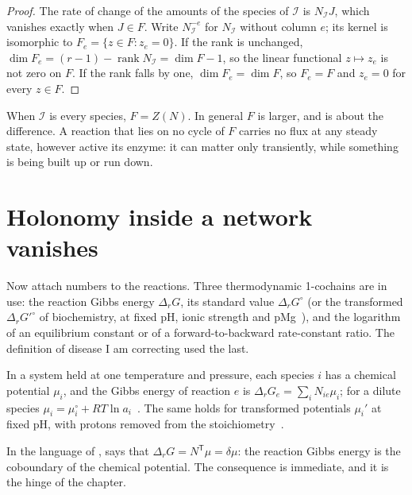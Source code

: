 \begin{proof}
The rate of change of the amounts of the species of $\mathcal I$ is
$N_{\mathcal I}J$, which vanishes exactly when $J\in F$. Write
$N_{\mathcal I}^{-e}$ for $N_{\mathcal I}$ without column $e$; its kernel is
isomorphic to $F_e=\{z\in F:z_e=0\}$. If the rank is unchanged,
$\dim F_e=(r-1)-\operatorname{rank}N_{\mathcal I}=\dim F-1$, so the linear
functional $z\mapsto z_e$ is not zero on $F$. If the rank falls by one,
$\dim F_e=\dim F$, so $F_e=F$ and $z_e=0$ for every $z\in F$.
\end{proof}

When $\mathcal I$ is every species, $F=Z(N)$. In general $F$ is larger, and
 is about the difference. A reaction that lies on no
cycle of $F$ carries no flux at any steady state, however active its enzyme:
it can matter only transiently, while something is being built up or run
down.

\section{Holonomy inside a network vanishes}
\label{c1:sec-internal}

Now attach numbers to the reactions. Three thermodynamic 1-cochains are in
use: the reaction Gibbs energy $\Delta_rG$, its standard value
$\Delta_rG^{\circ}$ (or the transformed $\Delta_rG'^{\circ}$ of biochemistry,
at fixed pH, ionic strength and pMg~\citep{alberty2003}), and the logarithm
of an equilibrium constant or of a forward-to-backward rate-constant ratio.
The definition of disease I am correcting used the last.

\begin{inputstmt}
\label{c1:in-state}
\lnkS{} In a system held at one temperature and pressure, each species $i$
has a chemical potential $\mu_i$, and the Gibbs energy of reaction $e$ is
$\Delta_rG_e=\sum_i N_{ie}\mu_i$; for a dilute species
$\mu_i=\mu_i^{\circ}+RT\ln a_i$~\citep{kondepudi1998,alberty2003}. The same
holds for transformed potentials $\mu_i'$ at fixed pH, with protons removed
from the stoichiometry~\citep{alberty2003}.
\end{inputstmt}

In the language of ,  says that
$\Delta_rG=N^{\mathsf T}\mu=\delta\mu$: the reaction Gibbs energy is the
coboundary of the chemical potential. The consequence is immediate, and it
is the hinge of the chapter.

